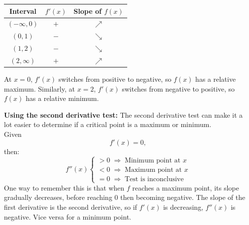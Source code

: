 \documentclass[12pt]{article}
\begin{document}
                \begin{center}
                    \begin{tabular}{|c|c|c|}
                        \hline
                        Interval & $f'(x)$ & Slope of $f(x)$ \\
                        \hline \hline
                        $(-\infty, 0)$ & $+$ & $\nearrow$ \\
                        \hline
                        $(0, 1)$ & $-$ & $\searrow$ \\
                        \hline
                        $(1, 2)$ & $-$ & $\searrow$ \\
                        \hline
                        $(2, \infty)$ & $+$ & $\nearrow$ \\
                        \hline
                    \end{tabular}
                \end{center}
                At $x=0$, $f'(x)$ switches from positive to negative, so $f(x)$ has a relative maximum. Similarly, at $x=2$, $f'(x)$ switches from negative to positive, so $f(x)$ has a relative minimum.

                \textbf{Using the second derivative test:}
                \newline
                The second derivative test can make it a lot easier to determine if a critical point is a maximum or minimum.
                \\ Given
                \[ f'(x) = 0, \]
                then:
                \[ f''(x) \begin{cases}
                    >0 \; \Rightarrow \; \text{Minimum point at $x$} \\
                    <0 \; \Rightarrow \; \text{Maximum point at $x$} \\
                    =0 \; \Rightarrow \; \text{Test is inconclusive}
                \end{cases} \]
                \newline
                One way to remember this is that when $f$ reaches a maximum point, its slope gradually decreases, before reaching $0$ then becoming negative. The slope of the first derivative is the second derivative, so if $f'(x)$ is decreasing, $f''(x)$ is negative. Vice versa for a minimum point.
\end{document}
